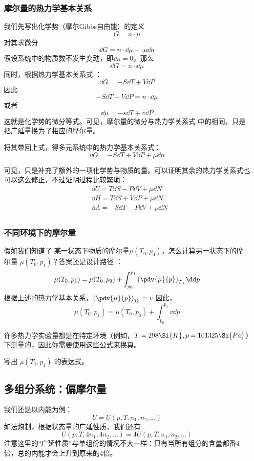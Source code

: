 \subsubsection{摩尔量的热力学基本关系}

我们先写出化学势（摩尔Gibbs自由能）的定义
$$G = n \cdot \mu$$
对其求微分
$$\dd G = n \cdot \dd \mu + \cdot \mu \dd n$$
假设系统中的物质数不发生变动，即$\dd n = 0$，那么
$$\dd G = n \cdot \dd \mu$$
同时，根据热力学基本关系式 ：
$$\dd G = -S \dd T + V \dd P$$
因此
$$-S \dd T + V \dd P = n \cdot \dd \mu$$
或者
$$
\dd \mu = -s \dd T + v \dd P
$$
这就是化学势的微分等式。可见，摩尔量的微分与热力学关系式 中的相同，只是把广延量换为了相应的摩尔量。

将其带回上式，得多元系统中的热力学基本关系式：
$$\dd G = -S \dd T + V \dd P + \mu \dd n$$

可见，只是补充了额外的一项化学势与物质的量。可以证明其余的热力学关系式也可以这么修正，不过证明过程比较繁琐：
$$
\begin{aligned}
&\dd U = T \dd S - P \dd V + \mu \dd N\\
&\dd H = T \dd S + V \dd P + \mu \dd N\\
&\dd A = -S \dd T - P \dd V + \mu \dd N\\
\end{aligned}
$$

\subsubsection{不同环境下的摩尔量}
假如我们知道了 某一状态下物质的摩尔量$\mu(T_0,p_0)$，怎么计算另一状态下的摩尔量 $\mu(T_0,p_1)$？答案还是设计路径 ：
$$\mu(T_0,p_1) = \mu(T_0,p_0) + \int_{p_0}^{p_1} \left( \pdv{\mu}{p} \right)_{T_0} \dd p$$
根据上述的热力学基本关系，$\left( \pdv{\mu}{p} \right)_{T_0} = v$
因此，$$\mu(T_0,p_1) = \mu(T_0,p_0) + \int_{p_0}^{p_1} v \dd p$$

许多热力学实验量都是在特定环境（例如，$T = 298 \Si{K}, p = 101325\Si{Pa}$）下测量的，因此你需要使用这些公式来换算。

\begin{exercise}{}
写出 $\mu(T_1,p_1)$ 的表达式。
\end{exercise}

\subsection{多组分系统：偏摩尔量}
我们还是以内能为例：
$$U = U (p, T, n_1, n_2, ...)$$
如法炮制，根据状态量的广延性质，我们还有
$$ U (p, T, 4n_1, 4n_2, ...) = 4U (p, T, n_1, n_2, ...)$$
注意这里的“广延性质”与单组份的情况不大一样：只有当所有组分的含量都番4倍，总的内能才会上升到原来的4倍。

